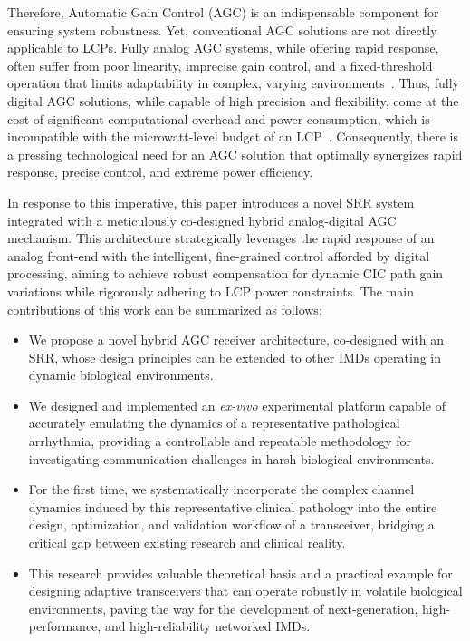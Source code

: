 \documentclass[journal]{IEEEtran}
\begin{document}
Therefore, Automatic Gain Control (AGC) is an indispensable component for ensuring system robustness.
Yet, conventional AGC solutions are not directly applicable to LCPs. Fully analog AGC systems, while offering rapid response, often suffer from poor linearity, imprecise gain control, and a fixed-threshold operation that limits adaptability in complex, varying environments~\cite{Zhao2023AnAF}.
Thus, fully digital AGC solutions, while capable of high precision and flexibility, come at the cost of significant computational overhead and power consumption, which is incompatible with the microwatt-level budget of an LCP~\cite{Li2020DigitalAC}.
Consequently, there is a pressing technological need for an AGC solution that optimally synergizes rapid response, precise control, and extreme power efficiency.

In response to this imperative, this paper introduces a novel SRR system integrated with a meticulously co-designed hybrid analog-digital AGC mechanism. This architecture strategically leverages the rapid response of an analog front-end  with the intelligent, fine-grained control afforded by digital processing, aiming to achieve robust compensation for dynamic CIC path gain variations while rigorously adhering to LCP power constraints. The main contributions of this work can be summarized as follows:

\begin{itemize}
    \item We propose a novel hybrid AGC receiver architecture, co-designed with an SRR, whose design principles can be extended to other IMDs operating in dynamic biological environments.
    \item We designed and implemented an \textit{ex-vivo} experimental platform capable of accurately emulating the dynamics of a representative pathological arrhythmia, providing a controllable and repeatable methodology for investigating communication challenges in harsh biological environments.

    \item For the first time, we systematically incorporate the complex channel dynamics induced by this representative clinical pathology into the entire design, optimization, and validation workflow of a transceiver, bridging a critical gap between existing research and clinical reality.

    \item This research provides valuable theoretical basis and a practical example for designing adaptive transceivers that can operate robustly in volatile biological environments, paving the way for the development of next-generation, high-performance, and high-reliability networked IMDs.
\end{itemize}
\end{document}
